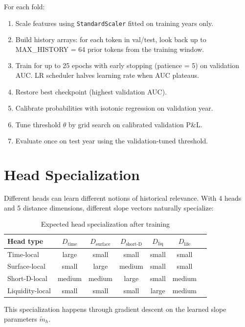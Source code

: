 \documentclass[11pt]{article}
\newcommand{\1}{\mathbf{1}}
\begin{document}
For each fold:
\begin{enumerate}[leftmargin=*]
  \item Scale features using \texttt{StandardScaler} fitted on training years only.
  \item Build history arrays: for each token in val/test, look back up to
        MAX\_HISTORY = 64 prior tokens from the training window.
  \item Train for up to 25 epochs with early stopping (patience = 5) on
        validation AUC. LR scheduler halves learning rate when AUC plateaus.
  \item Restore best checkpoint (highest validation AUC).
  \item Calibrate probabilities with isotonic regression on validation year.
  \item Tune threshold $\theta$ by grid search on calibrated validation P\&L.
  \item Evaluate once on test year using the validation-tuned threshold.
\end{enumerate}

\section{Head Specialization}

Different heads can learn different notions of historical relevance. With 4
heads and 5 distance dimensions, different slope vectors naturally specialize:

\begin{table}[h]
\centering
\caption{Expected head specialization after training}
\begin{tabular}{lcccccc}
\toprule
Head type & $D_{\mathrm{time}}$ & $D_{\mathrm{surface}}$ &
$D_{\mathrm{short\text{-}D}}$ & $D_{\mathrm{liq}}$ & $D_{\mathrm{life}}$ \\
\midrule
Time-local   & large  & small  & small  & small  & small \\
Surface-local & small & large  & medium & small  & small \\
Short-D-local & medium & medium & large & small  & medium \\
Liquidity-local & small & small & small & large  & medium \\
\bottomrule
\end{tabular}
\end{table}

This specialization happens through gradient descent on the learned slope
parameters $\tilde{m}_h$.
\end{document}
